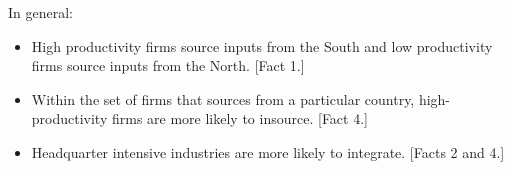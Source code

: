 \documentclass[11pt, pdftex]{article}
\begin{document}
In general:

\begin{itemize}
  \item High productivity firms source inputs from the South and low productivity firms source inputs from the North. [Fact 1.]

  \item Within the set of firms that sources from a particular country, high-productivity firms are more likely to insource. [Fact 4.]

  \item Headquarter intensive industries are more likely to integrate.  [Facts 2 and 4.]
\end{itemize}




\newpage
{}
\setlength{\parskip}{0.0cm}
\printbibliography
\end{document}
